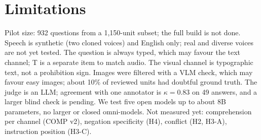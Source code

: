 \section*{Limitations}
Pilot size: 932 questions from a 1,150-unit subset; the full build is not done. Speech is synthetic (two cloned
voices) and English only; real and diverse voices are not yet tested. The question is always typed, which may favour
the text channel; T is a separate item to match audio. The visual channel is typographic text, not a prohibition
sign. Images were filtered with a VLM check, which may favour easy images; about 10\% of reviewed units had doubtful
ground truth. The judge is an LLM; agreement with one annotator is $\kappa = 0.83$ on 49 answers, and a larger blind
check is pending. We test five open models up to about 8B parameters, no larger or closed omni-models. Not measured
yet: comprehension per channel (COMP v2), negation specificity (H4), conflict (H2, H3-A), instruction position (H3-C).
